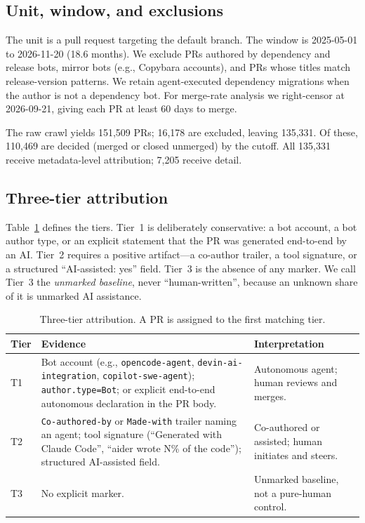 \documentclass[sigconf,review]{acmart}
\begin{document}
\subsection{Unit, window, and exclusions}

The unit is a pull request targeting the default branch. The window is 2025-05-01 to 2026-11-20 (18.6 months). We exclude PRs authored by dependency and release bots, mirror bots (e.g., Copybara accounts), and PRs whose titles match release-version patterns. We retain agent-executed dependency migrations when the author is not a dependency bot. For merge-rate analysis we right-censor at 2026-09-21, giving each PR at least 60 days to merge.

The raw crawl yields 151,509 PRs; 16,178 are excluded, leaving 135,331. Of these, 110,469 are decided (merged or closed unmerged) by the cutoff. All 135,331 receive metadata-level attribution; 7,205 receive detail.

\subsection{Three-tier attribution}

Table~\ref{tab:tiers} defines the tiers. Tier~1 is deliberately conservative: a bot account, a bot author type, or an explicit statement that the PR was generated end-to-end by an AI. Tier~2 requires a positive artifact---a co-author trailer, a tool signature, or a structured ``AI-assisted: yes'' field. Tier~3 is the absence of any marker. We call Tier~3 the \emph{unmarked baseline}, never ``human-written'', because an unknown share of it is unmarked AI assistance.

\begin{table}[t]
\centering
\small
\caption{Three-tier attribution. A PR is assigned to the first matching tier.}
\label{tab:tiers}
\begin{tabular}{@{}>{\raggedright\arraybackslash}p{}>{\raggedright\arraybackslash}p{}>{\raggedright\arraybackslash}p{}@{}}
\toprule
Tier & Evidence & Interpretation \\
\midrule
T1 & Bot account (e.g., \texttt{opencode-agent}, \texttt{devin-ai-integration}, \texttt{copilot-swe-agent}); \texttt{author.type=Bot}; or explicit end-to-end autonomous declaration in the PR body. & Autonomous agent; human reviews and merges. \\
T2 & \texttt{Co-authored-by} or \texttt{Made-with} trailer naming an agent; tool signature (``Generated with Claude Code'', ``aider wrote N\% of the code''); structured AI-assisted field. & Co-authored or assisted; human initiates and steers. \\
T3 & No explicit marker. & Unmarked baseline, not a pure-human control. \\
\bottomrule
\end{tabular}
\end{table}
\end{document}
